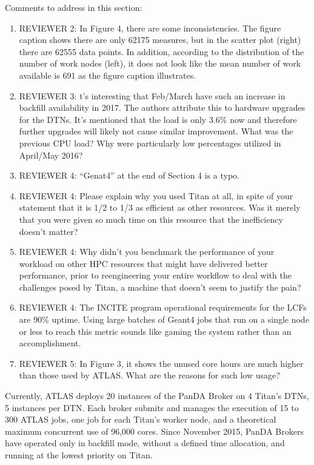 Comments to address in this section:
\begin{enumerate}
    \item REVIEWER 2: In Figure 4, there are some inconsistencies. The figure
    caption shows there are only 62175 measures, but in the scatter plot
    (right) there are 62555 data points. In addition, according to the
    distribution of the number of work nodes (left), it does not look like
    the mean number of work available is 691 as the figure caption
    illustrates.
    \item REVIEWER 3: t’s interesting that Feb/March have such an increase in
    backfill availability in 2017. The authors attribute this to hardware
    upgrades for the DTNs. It’s mentioned that the load is only 3.6\% now and
    therefore further upgrades will likely not cause similar improvement.
    What was the previous CPU load? Why were particularly low percentages
    utilized in April/May 2016?
    \item REVIEWER 4: “Genat4” at the end of Section 4 is a typo.
    \item REVIEWER 4: Please explain why you used Titan at all, in spite of
    your statement that it is 1/2 to 1/3 as efficient as other resources. Was
    it merely that you were given so much time on this resource that the
    inefficiency doesn’t matter?
    \item REVIEWER 4: Why didn’t you benchmark the performance of your
    workload on other HPC resources that might have delivered better
    performance, prior to reengineering your entire workflow to deal with the
    challenges posed by Titan, a machine that doesn’t seem to justify the
    pain?
    \item REVIEWER 4: The INCITE program operational requirements for the
    LCFs are 90\% uptime. Using large batches of Geant4 jobs that run on a
    single node or less to reach this metric sounds like gaming the system
    rather than an accomplishment.
    \item REVIEWER 5: In Figure 3, it shows the unused core hours are much
    higher than those used by ATLAS. What are the reasons for such low usage?
\end{enumerate}

Currently, ATLAS deploys 20 instances of the PanDA Broker on 4 Titan's DTNs,
5 instances per DTN\@. Each broker submits and manages the execution of 15 to
300 ATLAS jobs, one job for each Titan's worker node, and a theoretical
maximum concurrent use of 96,000 cores. Since November 2015, PanDA Brokers
have operated only in backfill mode, without a defined time allocation, and
running at the lowest priority on Titan.

